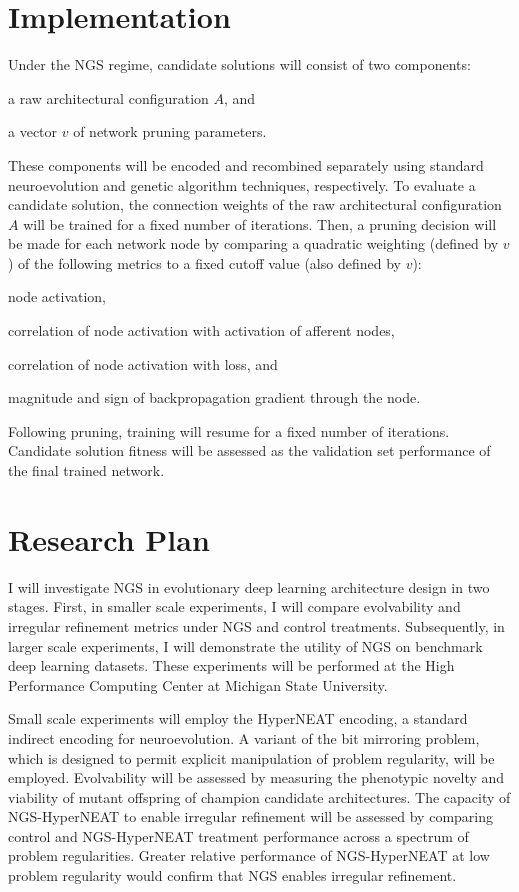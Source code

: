 \section{Implementation}

Under the NGS regime, candidate solutions will consist of two components:
\begin{enumerate*}[label=(\arabic*)]
\item a raw architectural configuration $A$, and
\item a vector $v$ of network pruning parameters.
\end{enumerate*}
These components will be encoded and recombined separately using standard neuroevolution and genetic algorithm techniques, respectively.
To evaluate a candidate solution, the connection weights of the raw architectural configuration $A$ will be trained for a fixed number of iterations.
Then, a pruning decision will be made for each network node by comparing a quadratic weighting (defined by $v$) of the following metrics to a fixed cutoff value (also defined by $v$):
\begin{enumerate*}[label=(\alph*)]
\item node activation,
\item correlation of node activation with activation of afferent nodes,
\item correlation of node activation with loss, and
\item magnitude and sign of backpropagation gradient through the node.
\end{enumerate*}
Following pruning, training will resume for a fixed number of iterations. Candidate solution fitness will be assessed as the validation set performance of the final trained network.

\section{Research Plan}

I will investigate NGS in evolutionary deep learning architecture design in two stages.
First, in smaller scale experiments, I will compare evolvability and irregular refinement metrics under NGS and control treatments. Subsequently, in larger scale experiments, I will demonstrate the utility of NGS on benchmark deep learning datasets.
These experiments will be performed at the High Performance Computing Center at Michigan State University.

Small scale experiments will employ the HyperNEAT encoding,\autocite{clune2011performance} a standard indirect encoding for neuroevolution.
A variant of the bit mirroring problem, which is designed to permit explicit manipulation of problem regularity, will be employed.
Evolvability will be assessed by measuring the phenotypic novelty and viability of mutant offspring of champion candidate architectures.
The capacity of NGS-HyperNEAT to enable irregular refinement will be assessed by comparing control and NGS-HyperNEAT treatment performance across a spectrum of problem regularities.
Greater relative performance of NGS-HyperNEAT at low problem regularity would confirm that NGS enables irregular refinement.

